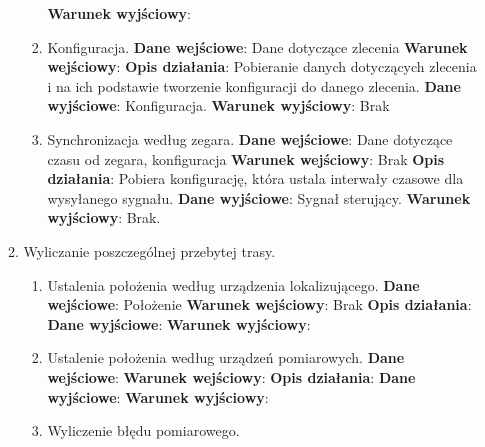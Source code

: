 \documentclass[11pt]{article}
\begin{document}
\begin{enumerate}
\begin{enumerate}[label*=\arabic*.]
\begin{enumerate}[label*=\arabic*.]
				\textbf{Warunek wyjściowy}:
			\item Konfiguracja. \newline
				\textbf{Dane wejściowe}: Dane dotyczące zlecenia	\newline
				\textbf{Warunek wejściowy}: 		\newline   	
				\textbf{Opis działania}: Pobieranie danych dotyczących zlecenia i na ich podstawie tworzenie konfiguracji do danego zlecenia.	\newline
				\textbf{Dane wyjściowe}: Konfiguracja.	\newline
				\textbf{Warunek wyjściowy}: Brak
			\item Synchronizacja według zegara. \newline
				\textbf{Dane wejściowe}: Dane dotyczące czasu od zegara, konfiguracja	\newline
				\textbf{Warunek wejściowy}: Brak		\newline   	
				\textbf{Opis działania}: Pobiera konfigurację, która ustala interwały czasowe dla wysyłanego sygnału.  	\newline
				\textbf{Dane wyjściowe}: Sygnał sterujący.	\newline
				\textbf{Warunek wyjściowy}: Brak.
			\end{enumerate}
			\item Wyliczanie poszczególnej przebytej trasy.
			\begin{enumerate}[label*=\arabic*.]
				\item Ustalenia położenia według urządzenia lokalizującego. \newline
				\textbf{Dane wejściowe}: Położenie	\newline
				\textbf{Warunek wejściowy}: Brak		\newline   	
				\textbf{Opis działania}: 	\newline
				\textbf{Dane wyjściowe}:	\newline
				\textbf{Warunek wyjściowy}:
				\item Ustalenie położenia według urządzeń pomiarowych. \newline
				\textbf{Dane wejściowe}:	\newline
				\textbf{Warunek wejściowy}: 		\newline   	
				\textbf{Opis działania}:	\newline
				\textbf{Dane wyjściowe}:	\newline
				\textbf{Warunek wyjściowy}:
				\item Wyliczenie błędu pomiarowego. \newline

\end{enumerate}
\end{enumerate}
\end{enumerate}
\end{document}
